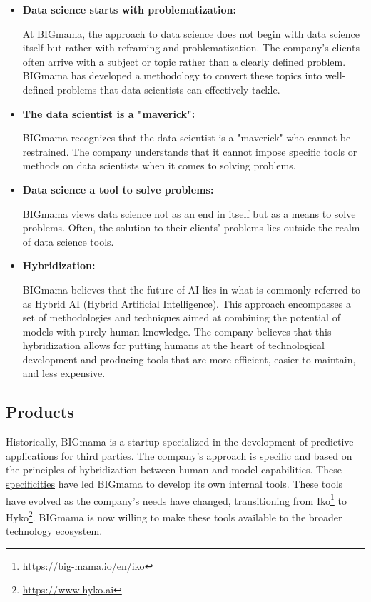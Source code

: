 \begin{itemize}
    \item \textbf{Data science starts with problematization:}

          At BIGmama, the approach to data science does not begin with data science itself but rather with reframing and problematization. The company's clients often arrive with a subject or topic rather than a clearly defined problem. BIGmama has developed a methodology to convert these topics into well-defined problems that data scientists can effectively tackle.

    \item \textbf{The data scientist is a "maverick":}

          BIGmama recognizes that the data scientist is a "maverick" who cannot be restrained. The company understands that it cannot impose specific tools or methods on data scientists when it comes to solving problems.

    \item \textbf{Data science a tool to solve problems:}

          BIGmama views data science not as an end in itself but as a means to solve problems. Often, the solution to their clients' problems lies outside the realm of data science tools.

    \item \textbf{Hybridization:}

          BIGmama believes that the future of AI lies in what is commonly referred to as Hybrid AI (Hybrid Artificial Intelligence). This approach encompasses a set of methodologies and techniques aimed at combining the potential of models with purely human knowledge. The company believes that this hybridization allows for putting humans at the heart of technological development and producing tools that are more efficient, easier to maintain, and less expensive.
\end{itemize}


\subsection{Products}

Historically, BIGmama is a startup specialized in the development of predictive applications for third parties. The company's approach is specific and based on the principles of hybridization between human and model capabilities. These \hyperref[specificities]{specificities} have led BIGmama to develop its own internal tools. These tools have evolved as the company's needs have changed, transitioning from Iko\footnote{\url{https://big-mama.io/en/iko}} to Hyko\footnote{\url{https://www.hyko.ai}}. BIGmama is now willing to make these tools available to the broader technology ecosystem.

